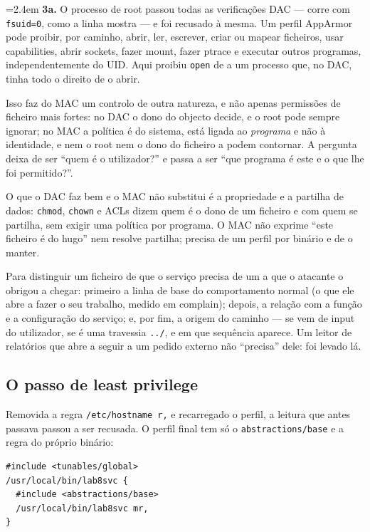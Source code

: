 \documentclass[a4paper,11pt]{article}
\newenvironment{answer}[1]{%
  \par\addvspace{7pt}\noindent
  \hangindent=2.4em\hangafter=1
  {\color{sscnblue}\bfseries #1\hspace{0.55em}}\ignorespaces}
  {\par\addvspace{5pt}}
\newcommand{\cmd}[1]{\textcolor{sscnblue}{\texttt{#1}}}
\newcommand{\file}[1]{\texttt{\detokenize{#1}}}
\begin{document}
\begin{answer}{3a.}
O processo de root passou todas as verifica\c{c}\~oes DAC --- corre com \cmd{fsuid=0},
como a linha mostra --- e foi recusado \`a mesma. Um perfil AppArmor pode proibir, por
caminho, abrir, ler, escrever, criar ou mapear ficheiros, usar capabilities, abrir
sockets, fazer mount, fazer ptrace e executar outros programas,
independentemente do UID. Aqui proibiu \cmd{open} de \file{/etc/shadow} a um processo
que, no DAC, tinha todo o direito de o abrir.

Isso faz do MAC um controlo de outra natureza, e n\~ao apenas permiss\~oes de ficheiro
mais fortes: no DAC o dono do objecto decide, e o root pode sempre ignorar; no MAC a
pol\'itica \'e do sistema, est\'a ligada ao \emph{programa} e n\~ao \`a identidade, e nem
o root nem o dono do ficheiro a podem contornar. A pergunta deixa de ser ``quem \'e o
utilizador?'' e passa a ser ``que programa \'e este e o que lhe foi permitido?''.

O que o DAC faz bem e o MAC n\~ao substitui \'e a propriedade e a partilha de dados:
\cmd{chmod}, \cmd{chown} e ACLs dizem quem \'e o dono de um ficheiro e com quem se
partilha, sem exigir uma pol\'itica por programa. O MAC n\~ao exprime ``este ficheiro
\'e do hugo'' nem resolve partilha; precisa de um perfil por bin\'ario e de o manter.

Para distinguir um ficheiro de que o servi\c{c}o precisa de um a que o atacante o
obrigou a chegar: primeiro a linha de base do comportamento normal (o que ele abre a
fazer o seu trabalho, medido em complain); depois, a rela\c{c}\~ao com a fun\c{c}\~ao e a
configura\c{c}\~ao do servi\c{c}o; e, por fim, a origem do caminho --- se vem de input do
utilizador, se \'e uma travessia \cmd{../}, e em que sequ\^encia aparece. Um leitor de
relat\'orios que abre \file{/etc/shadow} a seguir a um pedido externo n\~ao ``precisa''
dele: foi levado l\'a.
\end{answer}

\subsection*{O passo de least privilege}

Removida a regra \cmd{/etc/hostname r,} e recarregado o perfil, a leitura que antes
passava passou a ser recusada. O perfil final tem s\'o o \cmd{abstractions/base} e a
regra do pr\'oprio bin\'ario:

\begin{lstlisting}
#include <tunables/global>
/usr/local/bin/lab8svc {
  #include <abstractions/base>
  /usr/local/bin/lab8svc mr,
}
\end{lstlisting}
\end{document}
